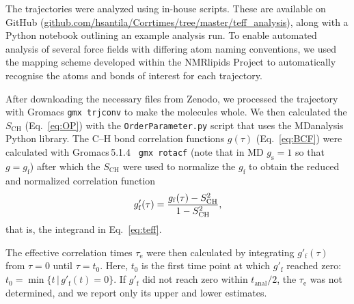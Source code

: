 \documentclass[journal=jcisd8,manuscript=article,layout=twocolumn]{achemso}
\begin{document}
The trajectories were analyzed using in-house scripts. These are available on GitHub (\url{github.com/hsantila/Corrtimes/tree/master/teff_analysis}), along with a Python notebook outlining an example analysis run.  To enable automated analysis of several force fields with differing atom naming conventions, we used the mapping scheme developed within the NMR\-lipids Project to automatically recognise the atoms and bonds of interest for each  trajectory.

After downloading the necessary files from Zenodo, we processed the trajectory with Gromacs \texttt{gmx trjconv} to make the molecules whole.
We then calculated the  $S_\mathrm{CH}$ (Eq.~\eqref{eq:OP}) with the \texttt{OrderParameter.py} script that uses the MDanalysis\cite{agrawal11,gowers16} Python library.
%
The \mbox{C--H} bond correlation functions
$g(\tau)$ (Eq.~\eqref{eq:BCF})
were calculated with Gromacs\,5.1.4~\cite{abraham2015gromacs} \texttt{gmx rotacf}
(note that in MD $g_\mathrm s =1$ so that $g = g_\mathrm{f}$)
after which the $S_\mathrm{CH}$ were used to
normalize the $g_\mathrm f$ to obtain %
the reduced and normalized correlation function
\begin{equation}
\label{eq:nBCF}
g'_{\mathrm{f}}(\tau)=\frac{g_{\mathrm{f}}(\tau)-S^{2}_{\rm{CH}}}{1-S^2_{\mathrm{CH}}},
\end{equation}
that is, the integrand in Eq.~\eqref{eq:teff}. 

The effective correlation times $\tau_\mathrm e$ were then calculated by integrating $g'_\mathrm f(\tau)$
from $\tau=0$ until $\tau = t_0$.
Here, $t_\mathrm 0$ is the first time point at which $g'_\mathrm f$ reached zero: $t_0 = \min
	\{
	t\,|\,g'_\mathrm f(t)=0
	\}
$.
%
If $g'_\mathrm f$ did not reach zero within 
$t_\mathrm{anal}/2$, the 
$\tau_\mathrm e$ was not determined,
and we report only its upper and lower estimates.
\end{document}
